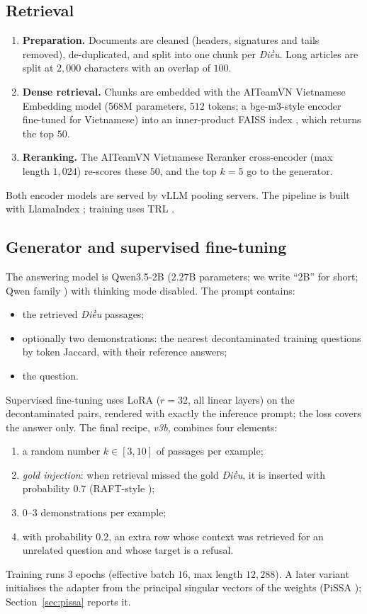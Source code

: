 \documentclass[11pt,a4paper]{article}
\newcommand{\dieu}{\textit{Điều}}
\begin{document}
\subsection{Retrieval}
\begin{enumerate}[leftmargin=*]
\item \textbf{Preparation.} Documents are cleaned (headers, signatures and tails removed), de-duplicated, and split into one chunk per \dieu. Long articles are split at $2{,}000$ characters with an overlap of $100$.
\item \textbf{Dense retrieval.} Chunks are embedded with the AITeamVN Vietnamese Embedding model (568M parameters, $512$ tokens; a bge-m3-style encoder \cite{bgem3} fine-tuned for Vietnamese) into an inner-product FAISS index \cite{faiss}, which returns the top $50$.
\item \textbf{Reranking.} The AITeamVN Vietnamese Reranker cross-encoder \cite{monobert} (max length $1{,}024$) re-scores these $50$, and the top $k{=}5$ go to the generator.
\end{enumerate}
Both encoder models are served by vLLM \cite{vllm} pooling servers. The pipeline is built with LlamaIndex \cite{llamaindex}; training uses TRL \cite{trl}.

\subsection{Generator and supervised fine-tuning}
The answering model is Qwen3.5-2B ($2.27$B parameters; we write ``2B'' for short; Qwen family \cite{qwen3}) with thinking mode disabled. The prompt contains:
\begin{itemize}[leftmargin=*]
\item the retrieved \dieu{} passages;
\item optionally two demonstrations: the nearest decontaminated training questions by token Jaccard, with their reference answers;
\item the question.
\end{itemize}
Supervised fine-tuning uses LoRA \cite{lora} ($r{=}32$, all linear layers) on the decontaminated pairs, rendered with exactly the inference prompt; the loss covers the answer only. The final recipe, \emph{v3b}, combines four elements:
\begin{enumerate}[leftmargin=*,label=(\alph*)]
\item a random number $k\in[3,10]$ of passages per example;
\item \emph{gold injection}: when retrieval missed the gold \dieu, it is inserted with probability $0.7$ (RAFT-style \cite{raft});
\item $0$--$3$ demonstrations per example;
\item with probability $0.2$, an extra row whose context was retrieved for an unrelated question and whose target is a refusal.
\end{enumerate}
Training runs $3$ epochs (effective batch $16$, max length $12{,}288$). A later variant initialises the adapter from the principal singular vectors of the weights (PiSSA \cite{pissa}); Section~\ref{sec:pissa} reports it.
\end{document}
